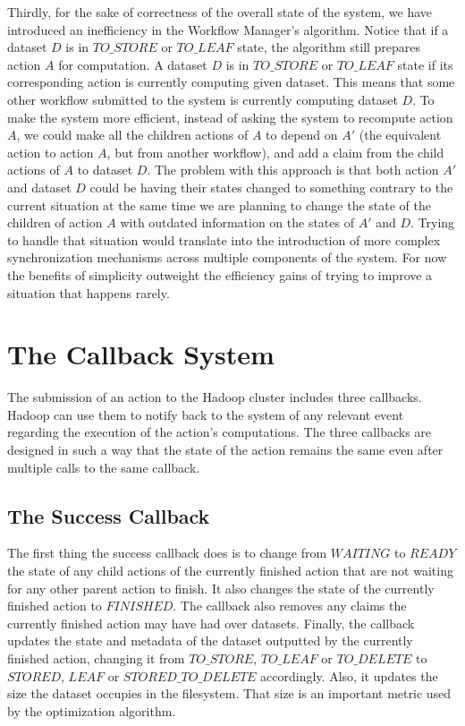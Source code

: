 Thirdly, for the sake of correctness of the overall state of the system, we have introduced an inefficiency in the Workflow Manager's algorithm. Notice that if a dataset $D$ is in $TO\_STORE$ or $TO\_LEAF$ state, the algorithm still prepares action $A$ for computation. A dataset $D$ is in $TO\_STORE$ or $TO\_LEAF$ state if its corresponding action is currently computing given dataset. This means that some other workflow submitted to the system is currently computing dataset $D$. To make the system more efficient, instead of asking the system to recompute action $A$, we could make all the children actions of $A$ to depend on $A'$ (the equivalent action to action $A$, but from another workflow), and add a claim from the child actions of $A$ to dataset $D$. The problem with this approach is that both action $A'$ and dataset $D$ could be having their states changed to something contrary to the current situation at the same time we are planning to change the state of the children of action $A$ with outdated information on the states of $A'$ and $D$. Trying to handle that situation would translate into the introduction of more complex synchronization mechanisms across multiple components of the system. For now the benefits of simplicity outweight the efficiency gains of trying to improve a situation that happens rarely.

\section{The Callback System}
\label{sec:callback_system}
The submission of an action to the Hadoop cluster includes three callbacks. Hadoop can use them to notify back to the system of any relevant event regarding the execution of the action's computations. The three callbacks are designed in such a way that the state of the action remains the same even after multiple calls to the same callback.

\subsection{The Success Callback}
The first thing the success callback does is to change from $WAITING$ to $READY$ the state of any child actions of the currently finished action that are not waiting for any other parent action to finish. It also changes the state of the currently finished action to $FINISHED$. The callback also removes any claims the currently finished action may have had over datasets. Finally, the callback updates the state and metadata of the dataset outputted by the currently finished action, changing it from $TO\_STORE$, $TO\_LEAF$ or $TO\_DELETE$ to $STORED$, $LEAF$ or $STORED\_TO\_DELETE$ accordingly. Also, it updates the size the dataset occupies in the filesystem. That size is an important metric used by the optimization algorithm.

